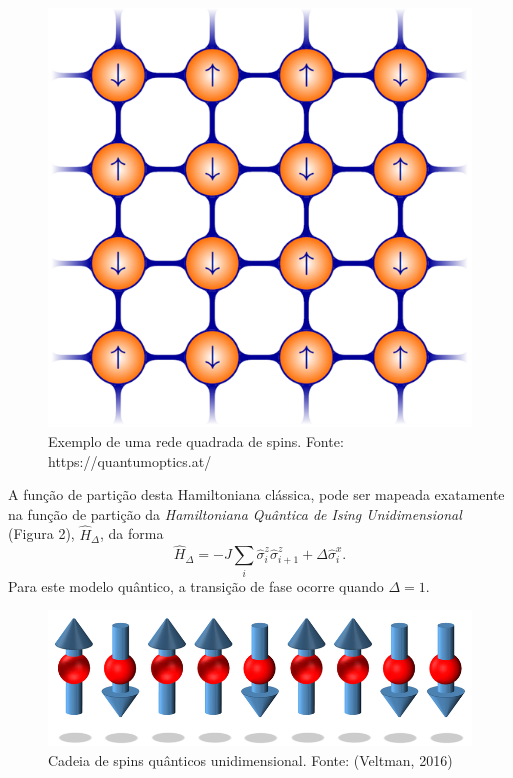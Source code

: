\documentclass[plainsections, 32pt]{sciposter}
\begin{document}
\begin{multicols}{2}
\begin{figure}
  \center
  \includegraphics[scale = .9]{lattice.png}
  \caption{Exemplo de uma rede quadrada de spins. Fonte: https://quantumoptics.at/}
\end{figure}

\vspace{-15mm}
A função de partição desta Hamiltoniana clássica, pode ser mapeada exatamente na função de partição da \textit{Hamiltoniana Quântica de Ising Unidimensional} (Figura 2), $\hat{H}_\Delta$, da forma
\begin{equation}
  \hat{H}_{\Delta} = -J\sum_i \hat{\sigma}_{i}^z \hat{\sigma}_{i+1}^z + \Delta \hat{\sigma}_i^x.
\end{equation}
Para este modelo quântico, a transição de fase ocorre quando $\Delta = 1$.

\begin{figure}
  \center
  \includegraphics[scale = .45]{chain.png}
  \caption{Cadeia de spins quânticos unidimensional. Fonte: (Veltman, 2016)}
\end{figure}


\end{multicols}
\end{document}
